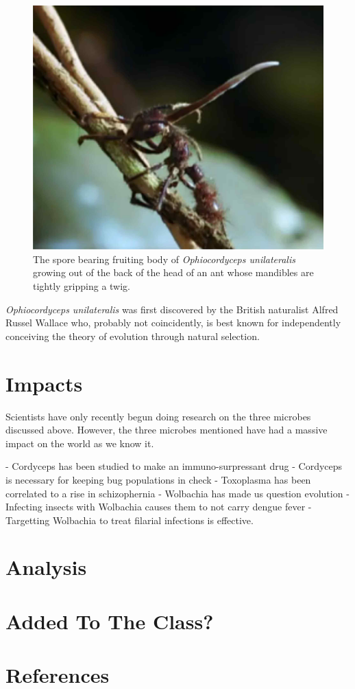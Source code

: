 \documentclass[twocolumn]{article}
\begin{document}
\begin{figure}[!ht]
    \centering
    \includegraphics[width=.4\textwidth]{images/cordyceps_ant.jpg}
    \caption{The spore bearing fruiting body of \textit{Ophiocordyceps unilateralis} growing out of the back of the head of an ant whose mandibles are tightly gripping a twig. }
    \label{fig:cordyceps_ant}
\end{figure}

\textit{Ophiocordyceps unilateralis} was first discovered by the British naturalist Alfred Russel Wallace who, probably not coincidently, is best known for independently conceiving the theory of evolution through natural selection. 


\section*{Impacts}

Scientists have only recently begun doing research on the three microbes discussed above. However, the three microbes mentioned have had a massive impact on the world as we know it. 

- Cordyceps has been studied to make an immuno-surpressant drug
- Cordyceps is necessary for keeping bug populations in check
- Toxoplasma has been correlated to a rise in schizophernia
- Wolbachia has made us question evolution
- Infecting insects with Wolbachia causes them to not carry dengue fever
- Targetting Wolbachia to treat filarial infections is effective.

\section*{Analysis}

\section*{Added To The Class?}

\section*{References}

\printbibliography
\end{document}
